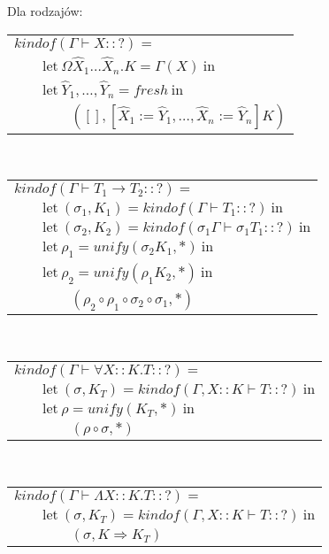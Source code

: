\documentclass[11pt,leqno]{article}
\begin{document}
Dla rodzajów: \\
\begin{tabular}{l}
$kindof(\Gamma \vdash X :: ?) = $ \\
$\qquad \textrm{let} \ \Omega \widehat{X}_1 \dots \widehat{X}_n.K = \Gamma(X) \ \textrm{in} $ \\
$\qquad \textrm{let} \ \widehat{Y}_1, \dots, \widehat{Y}_n = fresh \ \textrm{in} $ \\
$\qquad\qquad ([], [\widehat{X}_1 := \widehat{Y}_1, \dots ,\widehat{X}_n := \widehat{Y}_n]K) $ \\
\end{tabular} \\
\begin{tabular}{l}
$kindof(\Gamma \vdash T_1 \rightarrow T_2 :: ?) = $ \\
$\qquad \textrm{let} \ (\sigma_1, K_1) = kindof(\Gamma \vdash T_1 :: ?) \ \textrm{in} $ \\
$\qquad \textrm{let} \ (\sigma_2, K_2) = kindof(\sigma_1 \Gamma \vdash \sigma_1 T_1 :: ?) \ \textrm{in} $ \\
$\qquad \textrm{let} \ \rho_1 = unify(\sigma_2 K_1, *) \ \textrm{in} $ \\
$\qquad \textrm{let} \ \rho_2 = unify(\rho_1 K_2, *) \ \textrm{in} $ \\
$\qquad\qquad (\rho_2 \circ \rho_1 \circ \sigma_2 \circ \sigma_1, *) $ \\
\end{tabular} \\
\begin{tabular}{l}
$kindof(\Gamma \vdash \forall X::K.T :: ?) = $ \\
$\qquad \textrm{let} \ (\sigma, K_T) = kindof(\Gamma, X::K \vdash T :: ?) \ \textrm{in} $ \\
$\qquad \textrm{let} \ \rho = unify(K_T, *) \ \textrm{in} $ \\
$\qquad\qquad (\rho \circ \sigma, *) $ \\
\end{tabular} \\
\begin{tabular}{l}
$kindof(\Gamma \vdash \Lambda X::K.T :: ?) = $ \\
$\qquad \textrm{let} \ (\sigma, K_T) = kindof(\Gamma, X::K \vdash T :: ?) \ \textrm{in} $ \\
$\qquad\qquad (\sigma, K \Rightarrow K_T) $ \\
\end{tabular} \\
\end{document}
